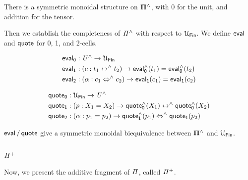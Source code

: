 \begin{proposition}
  There is a symmetric monoidal structure on $\mathbf{\Pi^{\wedge}}$, with $0$ for the unit, and addition for the tensor.
\end{proposition}

Then we establish the completeness of $\mathit{{\Pi}^{\wedge}}$ with respect to $\UFin$. We define $\evalt$ and $\quotet$ for 0, 1,
and 2-cells.

\begin{definition}
  \begin{align*}
    \evalt_{0} & : \UHat \to \UFin                                                          \\
    \evalt_{1} & : (c : t_{1} \isoh t_{2}) \to \evalh_{0}(t_{1}) \id \evalh_{0}(t_{2})      \\
    \evalt_{2} & : (\alpha : c_{1} \Isoh c_{2}) \to \evalt_{1}(c_{1}) \id \evalt_{1}(c_{2}) \\
  \end{align*}
\end{definition}

\begin{definition}
  \begin{align*}
    \quotet_{0} & : \UFin \to \UHat                                                            \\
    \quotet_{1} & : (p : X_{1} \id X_{2}) \to \quoteh_{0}(X_{1}) \isoh \quoteh_{0}(X_{2})      \\
    \quotet_{2} & : (\alpha : p_{1} \id p_{2}) \to \quoteh_{1}(p_{1}) \Isoh \quotet_{1}(p_{2}) \\
  \end{align*}
\end{definition}

\begin{proposition}
  $\evalt/\quotet$ give a symmetric monoidal biequivalence between $\mathbf{\Pi^{\wedge}}$ and $\UFin$.
\end{proposition}

\subsection{$\mathit{{\Pi}^{+}}$}

Now, we present the additive fragment of $\mathit{\Pi}$, called $\mathit{{\Pi}^{+}}$.

